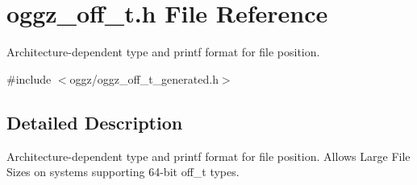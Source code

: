 \section{oggz\_\-off\_\-t.h File Reference}
\label{oggz__off__t_8h}


Architecture-\/dependent type and printf format for file position.  


{\ttfamily \#include $<$oggz/oggz\_\-off\_\-t\_\-generated.h$>$}\par


\subsection{Detailed Description}
Architecture-\/dependent type and printf format for file position. Allows Large File Sizes on systems supporting 64-\/bit off\_\-t types. 